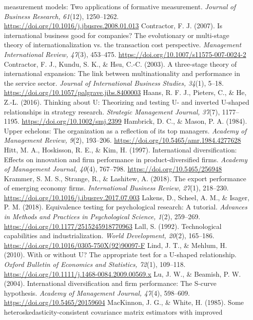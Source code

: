 \documentclass[12pt,a4paper]{article}
\begin{document}
measurement models: Two applications of formative measurement.
\emph{Journal of Business Research, 61}(12), 1250--1262.
\url{https://doi.org/10.1016/j.jbusres.2008.01.013} Contractor, F. J.
(2007). Is international business good for companies? The evolutionary
or multi-stage theory of internationalization vs. the transaction cost
perspective. \emph{Management International Review, 47}(3), 453--475.
\url{https://doi.org/10.1007/s11575-007-0024-2} Contractor, F. J.,
Kundu, S. K., \& Hsu, C.-C. (2003). A three-stage theory of
international expansion: The link between multinationality and
performance in the service sector. \emph{Journal of International
Business Studies, 34}(1), 5--18.
\url{https://doi.org/10.1057/palgrave.jibs.8400003} Haans, R. F. J.,
Pieters, C., \& He, Z.-L. (2016). Thinking about U: Theorizing and
testing U- and inverted U-shaped relationships in strategy research.
\emph{Strategic Management Journal, 37}(7), 1177--1195.
\url{https://doi.org/10.1002/smj.2399} Hambrick, D. C., \& Mason, P. A.
(1984). Upper echelons: The organization as a reflection of its top
managers. \emph{Academy of Management Review, 9}(2), 193--206.
\url{https://doi.org/10.5465/amr.1984.4277628} Hitt, M. A., Hoskisson,
R. E., \& Kim, H. (1997). International diversification: Effects on
innovation and firm performance in product-diversified firms.
\emph{Academy of Management Journal, 40}(4), 767--798.
\url{https://doi.org/10.5465/256948} Krammer, S. M. S., Strange, R., \&
Lashitew, A. (2018). The export performance of emerging economy firms.
\emph{International Business Review, 27}(1), 218--230.
\url{https://doi.org/10.1016/j.ibusrev.2017.07.003} Lakens, D., Scheel,
A. M., \& Isager, P. M. (2018). Equivalence testing for psychological
research: A tutorial. \emph{Advances in Methods and Practices in
Psychological Science, 1}(2), 259--269.
\url{https://doi.org/10.1177/2515245918770963} Lall, S. (1992).
Technological capabilities and industrialization. \emph{World
Development, 20}(2), 165--186.
\url{https://doi.org/10.1016/0305-750X(92)90097-F} Lind, J. T., \&
Mehlum, H. (2010). With or without U? The appropriate test for a
U-shaped relationship. \emph{Oxford Bulletin of Economics and
Statistics, 72}(1), 109--118.
\url{https://doi.org/10.1111/j.1468-0084.2009.00569.x} Lu, J. W., \&
Beamish, P. W. (2004). International diversification and firm
performance: The S-curve hypothesis. \emph{Academy of Management
Journal, 47}(4), 598--609. \url{https://doi.org/10.5465/20159604}
MacKinnon, J. G., \& White, H. (1985). Some
heteroskedasticity-consistent covariance matrix estimators with improved
\end{document}
